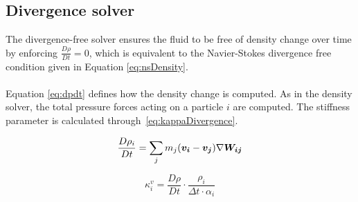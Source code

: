 \subsection{Divergence solver} \label{divergenceSolver}

    The divergence-free solver ensures the fluid to be free of density change over time by enforcing $\frac{D\rho}{Dt} = 0$, which is equivalent to the Navier-Stokes divergence free condition given in Equation \ref{eq:nsDensity}. \\ \\ Equation \ref{eq:dpdt} defines how the density change is computed. As in the density solver, the total pressure forces acting on a particle $i$ are computed. The stiffness parameter is calculated through~\ref{eq:kappaDivergence}.

    \begin{equation} \label{eq:dpdt}
        \frac{D\rho_i}{Dt} = \sum_j m_j (\bm{v_i} - \bm{v_j})\nabla \bm{W_{ij}}
    \end{equation}

    \begin{equation}\label{eq:kappaDivergence}
        \kappa_i^v = \frac{D\rho}{Dt} \cdot \frac{\rho_i}{\Delta t \cdot \alpha_i}
    \end{equation}

